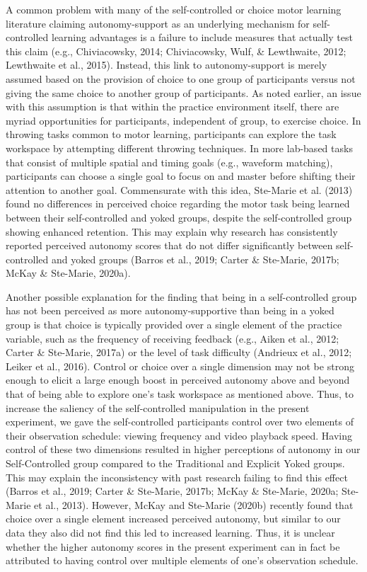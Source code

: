 \documentclass[
  english,
  doc, donotrepeattitle,floatsintext]{apa7}
\begin{document}
A common problem with many of the self-controlled or choice motor learning literature claiming autonomy-support as an underlying mechanism for self-controlled learning advantages is a failure to include measures that actually test this claim (e.g., Chiviacowsky, 2014; Chiviacowsky, Wulf, \& Lewthwaite, 2012; Lewthwaite et al., 2015). Instead, this link to autonomy-support is merely assumed based on the provision of choice to one group of participants versus not giving the same choice to another group of participants. As noted earlier, an issue with this assumption is that within the practice environment itself, there are myriad opportunities for participants, independent of group, to exercise choice. In throwing tasks common to motor learning, participants can explore the task workspace by attempting different throwing techniques. In more lab-based tasks that consist of multiple spatial and timing goals (e.g., waveform matching), participants can choose a single goal to focus on and master before shifting their attention to another goal. Commensurate with this idea, Ste-Marie et al. (2013) found no differences in perceived choice regarding the motor task being learned between their self-controlled and yoked groups, despite the self-controlled group showing enhanced retention. This may explain why research has consistently reported perceived autonomy scores that do not differ significantly between self-controlled and yoked groups (Barros et al., 2019; Carter \& Ste-Marie, 2017b; McKay \& Ste-Marie, 2020a).

Another possible explanation for the finding that being in a self-controlled group has not been perceived as more autonomy-supportive than being in a yoked group is that choice is typically provided over a single element of the practice variable, such as the frequency of receiving feedback (e.g., Aiken et al., 2012; Carter \& Ste-Marie, 2017a) or the level of task difficulty (Andrieux et al., 2012; Leiker et al., 2016). Control or choice over a single dimension may not be strong enough to elicit a large enough boost in perceived autonomy above and beyond that of being able to explore one's task workspace as mentioned above. Thus, to increase the saliency of the self-controlled manipulation in the present experiment, we gave the self-controlled participants control over two elements of their observation schedule: viewing frequency and video playback speed. Having control of these two dimensions resulted in higher perceptions of autonomy in our Self-Controlled group compared to the Traditional and Explicit Yoked groups. This may explain the inconsistency with past research failing to find this effect (Barros et al., 2019; Carter \& Ste-Marie, 2017b; McKay \& Ste-Marie, 2020a; Ste-Marie et al., 2013). However, McKay and Ste-Marie (2020b) recently found that choice over a single element increased perceived autonomy, but similar to our data they also did not find this led to increased learning. Thus, it is unclear whether the higher autonomy scores in the present experiment can in fact be attributed to having control over multiple elements of one's observation schedule.
\end{document}
